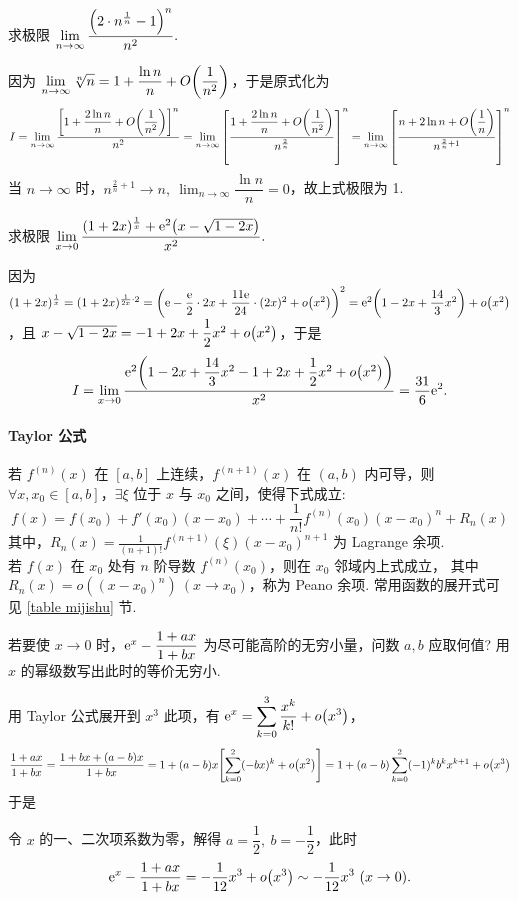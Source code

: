 \begin{example}
    求极限 $\displaystyle\lim_{n\to\infty}\dfrac{\qty(2\cdot n^{\frac{1}{n}}-1)^n}{n^2}.$
\end{example}
\begin{solution}
    因为 $\displaystyle \lim_{n\to\infty}\sqrt[n]{n}=1+\dfrac{\ln n}{n}+O\qty(\dfrac{1}{n^2})$，于是原式化为
    $$I=\lim_{n\to\infty}\dfrac{\qty[1+\dfrac{2\ln n}{n}+O\qty(\dfrac{1}{n^2})]^n}{n^2}=\lim_{n\to\infty}\qty[\dfrac{1+\dfrac{2\ln n}{n}+O\qty(\dfrac{1}{n^2})}{n^{\frac{2}{n}}}]^n=\lim_{n\to\infty}\qty[\dfrac{n+2\ln n+O\qty(\dfrac{1}{n})}{n^{\frac{2}{n}+1}}]^n$$
    当 $n\to\infty$ 时，$n^{\frac{2}{n}+1}\to n,~\displaystyle\lim_{n\to\infty}\dfrac{\ln n}{n}=0$，故上式极限为 1.
\end{solution}

\begin{example}
    求极限 $\displaystyle \lim_{x\to0}\dfrac{(1+2x)^{\frac{1}{x}}+\mathrm{e}^{2}\qty(x-\sqrt{1-2x})}{x^2}.$
\end{example}
\begin{solution}
    因为 $(1+2x)^{\frac{1}{x}}=(1+2x)^{\frac{1}{2x}\cdot 2}=\qty(\mathrm{e}-\dfrac{\mathrm{e}}{2}\cdot2x+\dfrac{11\mathrm{e}}{24}\cdot(2x)^2+o\qty(x^2))^2=\mathrm{e}^2\qty(1-2x+\dfrac{14}{3}x^2)+o\qty(x^2)$，且 $x-\sqrt{1-2x}=-1+2x+\dfrac{1}{2}x^2+o\qty(x^2)$，于是
    $$I=\lim_{x\to0}\dfrac{\mathrm{e}^2\qty(1-2x+\dfrac{14}{3}x^2-1+2x+\dfrac{1}{2}x^2+o\qty(x^2))}{x^2}=\dfrac{31}{6}\mathrm{e}^2.$$
\end{solution}

\paragraph{Taylor 公式}
若 $f^{(n)}(x)$ 在 $[a,b]$ 上连续，$f^{(n+1)}(x)$ 在 $(a,b)$ 内可导，则 $\forall x,x_0\in[a,b]$，$\exists \xi$ 位于 $x$ 与 $x_0$ 之间，使得下式成立:
$$f(x)=f(x_0)+f'(x_0)(x-x_0)+\cdots+\frac{1}{n!}f^{(n)}(x_0)(x-x_0)^n+R_n(x)$$
其中，$\displaystyle R_n(x)=\frac{1}{(n+1)!}f^{(n+1)}(\xi)(x-x_0)^{n+1}$ 为 Lagrange 余项.\\
若 $f(x)$ 在 $x_0$ 处有 $n$ 阶导数 $f^{(n)}(x_0)$，则在 $x_0$ 邻域内上式成立，
其中 $R_n(x)=o((x-x_0)^n)~ (x\to x_0)$，称为 Peano 余项. 常用函数的展开式可见 \ref{table mijishu} 节.

\begin{example}
    若要使 $x\to0$ 时，$\mathrm{e}^x-\dfrac{1+ax}{1+bx}$ 为尽可能高阶的无穷小量，问数 $a,b$ 应取何值? 用 $x$ 的幂级数写出此时的等价无穷小.
\end{example}
\begin{solution}
    用 Taylor 公式展开到 $x^3$ 此项，有 $\displaystyle\mathrm{e}^x=\sum_{k=0}^{3}\dfrac{x^k}{k!}+o\qty(x^3)$，
    $$\dfrac{1+ax}{1+bx}=\dfrac{1+bx+(a-b)x}{1+bx}=1+(a-b)x\qty[\sum_{k=0}^{2}(-bx)^k+o\qty(x^2)]=1+(a-b)\sum_{k=0}^{2}(-1)^kb^kx^{k+1}+o\qty(x^3)$$
    于是
    令 $x$ 的一、二次项系数为零，解得 $a=\dfrac{1}{2},~b=-\dfrac{1}{2}$，此时 $$\mathrm{e}^x-\dfrac{1+ax}{1+bx}=-\dfrac{1}{12}x^3+o\qty(x^3)\sim-\dfrac{1}{12}x^3~ (x\to0).$$
\end{solution}


